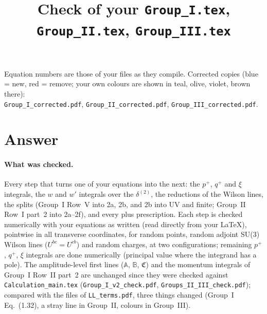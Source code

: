 \documentclass[10pt]{article}
\title{Check of your \texttt{Group\_I.tex}, \texttt{Group\_II.tex}, \texttt{Group\_III.tex}}
\date{}
\newcommand{\new}[1]{{\color{blue}#1}}
\newcommand{\old}[1]{{\color{red}#1}}
\begin{document}
\maketitle
\noindent Equation numbers are those of your files as they compile. Corrected copies (\new{blue} = new, \old{red} = remove; your own colours are shown in teal, olive, violet, brown there):\\ \texttt{Group\_I\_corrected.pdf}, \texttt{Group\_II\_corrected.pdf}, \texttt{Group\_III\_corrected.pdf}.

\section{Answer}
\paragraph{What was checked.} Every step that turns one of your equations into the next: the $p^+$, $q^+$ and $\xi$ integrals, the $w$ and $w'$ integrals over the $\delta^{(2)}$, the reductions of the Wilson lines, the splits (Group~I Row~V into 2a, 2b, and 2b into UV and finite; Group~II Row~I part~2 into 2a--2f), and every plus prescription. Each step is checked numerically with your equations as written (read directly from your \LaTeX), pointwise in all transverse coordinates, for random points, random adjoint SU(3) Wilson lines ($U^{bc}=U^{cb}$) and random charges, at two configurations; remaining $p^+$, $q^+$, $\xi$ integrals are done numerically (principal value where the integrand has a pole). The amplitude-level first lines ($\mathbb A$, $\mathbb B$, $\mathfrak C$) and the momentum integrals of Group~I Row~II part~2 are unchanged since they were checked against \texttt{Calculation\_main.tex} (\texttt{Group\_I\_v2\_check.pdf}, \texttt{Groups\_II\_III\_check.pdf}); compared with the files of \texttt{LL\_terms.pdf}, three things changed (Group~I Eq.~(1.32), a stray line in Group~II, colours in Group~III).
\end{document}
